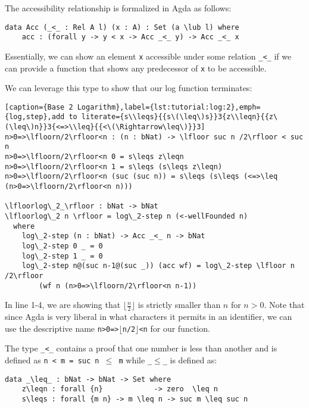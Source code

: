 The accessibility relationship is formalized in Agda as follows:

\begin{lstlisting}[caption={The Acc type},label={lst:tutorial:acc},emph={Acc,acc}]
data Acc (_<_ : Rel A l) (x : A) : Set (a \lub l) where
    acc : (forall y -> y < x -> Acc _<_ y) -> Acc _<_ x
\end{lstlisting}

Essentially, we can show an element \texttt{x} accessible under some relation \texttt{\_<\_} if we can provide a function that shows any predecessor of \texttt{x} to be accessible.

We can leverage this type to show that our log function terminates:

\begin{lstlisting}[caption={Base 2 Logarithm},label={lst:tutorial:log:2},emph={log,step},add to literate={s\\leqs}{{s\(\leq\)s}}3{z\\leqn}{{z\(\leq\)n}}3{<=>\\leq}{{<\(\Rightarrow\leq\)}}3]
n>0=>\lfloorn/2\rfloor<n : (n : bNat) -> \lfloor suc n /2\rfloor < suc n
n>0=>\lfloorn/2\rfloor<n 0 = s\leqs z\leqn
n>0=>\lfloorn/2\rfloor<n 1 = s\leqs (s\leqs z\leqn)
n>0=>\lfloorn/2\rfloor<n (suc (suc n)) = s\leqs (s\leqs (<=>\leq (n>0=>\lfloorn/2\rfloor<n n)))

\lfloorlog\_2_\rfloor : bNat -> bNat
\lfloorlog\_2 n \rfloor = log\_2-step n (<-wellFounded n)
  where
    log\_2-step (n : bNat) -> Acc _<_ n -> bNat
    log\_2-step 0 _ = 0
    log\_2-step 1 _ = 0
    log\_2-step n@(suc n-1@(suc _)) (acc wf) = log\_2-step \lfloor n /2\rfloor
        (wf n (n>0=>\lfloorn/2\rfloor<n n-1))
\end{lstlisting}


In line 1-4, we are showing that $\lfloor \frac n 2 \rfloor$ is strictly smaller than $n$ for $n > 0$. Note that since Agda is very liberal in what characters it permits in an identifier, we can use the descriptive name \texttt{n>0=>$\lfloor$n/2$\rfloor$<n} for our function.

The type \texttt{\_<\_} contains a proof that one number is less than another and is defined as \texttt{n < m = suc n $\leq$ m} while \texttt{\_$\leq$\_} is defined as:

\begin{lstlisting}[caption={Definition of $\leq$},label={lst:tutorial:leq}]
data _\leq_ : bNat -> bNat -> Set where
    z\leqn : forall {n}            -> zero  \leq n
    s\leqs : forall {m n} -> m \leq n -> suc m \leq suc n
\end{lstlisting}

